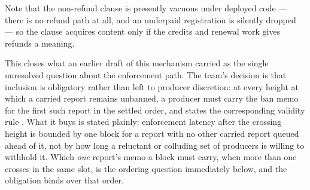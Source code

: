 Note that the non-refund clause is presently vacuous under deployed code — there is no refund
path at all, and an underpaid registration is silently dropped  — so the
clause acquires content only if the credits and renewal work gives refunds a meaning.

\begin{property}
\label{prop:23:inclusion-required}
This closes what an earlier draft of this mechanism carried as the single unresolved question about
the enforcement path. The team's decision is that inclusion is obligatory rather than left to
producer discretion: at every height at which a carried report remains unbanned, a producer must
carry the ban memo for the first such report in the settled order, and  states the
corresponding validity rule
. What it buys is stated plainly:
enforcement latency after the crossing height is bounded by one block for a report with no other
carried report queued ahead of it, not by how long a reluctant or colluding set of producers is
willing to withhold it. Which \emph{one} report's memo a block
must carry, when more than one crosses in the same slot, is the ordering question
immediately below, and the obligation binds over that order.
\end{property}


